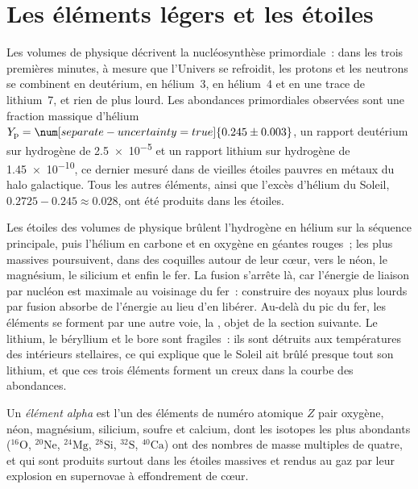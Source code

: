 \section{Les éléments légers et les étoiles}\label{sec:b3:origin-of-elements:stars}

Les volumes de physique décrivent la nucléosynthèse primordiale~: dans les trois
premières minutes, à mesure que l'Univers se refroidit, les protons et les neutrons se
combinent en deutérium, en hélium~3, en hélium~4 et en une trace de lithium~7, et rien
de plus lourd. Les abondances primordiales observées sont une fraction massique
d'hélium $Y_\mathrm{p} = \num[separate-uncertainty=true]{0.245 \pm 0.003}$, un
rapport deutérium sur hydrogène de \num{2.5e-5} et un rapport lithium sur hydrogène
de \num{1.45e-10}, ce dernier mesuré dans de vieilles étoiles pauvres en métaux du halo
galactique. Tous les autres éléments, ainsi que l'excès d'hélium du Soleil,
$0.2725 - 0.245 \approx 0.028$, ont été produits dans les étoiles.

Les étoiles des volumes de physique brûlent l'hydrogène en hélium sur la
séquence principale, puis l'hélium en carbone et en oxygène en géantes rouges~; les plus
massives poursuivent, dans des coquilles autour de leur cœur, vers le néon, le magnésium,
le silicium et enfin le fer. La fusion s'arrête là, car l'énergie de liaison
par nucléon est maximale au voisinage du fer~: construire des noyaux plus lourds par
fusion absorbe de l'énergie au lieu d'en libérer. Au-delà du pic du fer, les
éléments se forment par une autre voie, la , objet de la
section suivante. Le lithium, le béryllium et le bore sont fragiles~:
ils sont détruits aux températures des intérieurs stellaires, ce qui
explique que le Soleil ait brûlé presque tout son lithium, et que ces trois éléments
forment un creux dans la courbe des abondances.

\begin{definition}\label{def:b3:origin-of-elements:alpha}
Un \emph{élément alpha} est l'un des éléments de numéro atomique $Z$ pair
oxygène, néon, magnésium, silicium, soufre et calcium, dont les
isotopes les plus abondants ($^{16}\mathrm{O}$, $^{20}\mathrm{Ne}$,
$^{24}\mathrm{Mg}$, $^{28}\mathrm{Si}$, $^{32}\mathrm{S}$,
$^{40}\mathrm{Ca}$) ont des nombres de masse multiples de quatre, et
qui sont produits surtout dans les étoiles massives et rendus au gaz par leur
explosion en supernovae à effondrement de cœur.
\end{definition}

